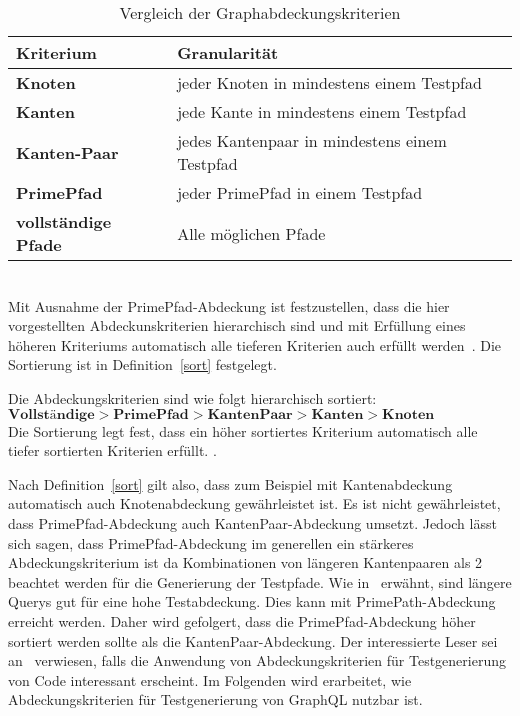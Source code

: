 \begin{center}
    \begin{table}[!ht]
        \begin{tabularx}{\textwidth}{|C|C|}
            \hline
            \textbf{Kriterium} & \textbf{Granularität}  \\
            \hline
            \textbf{Knoten} & jeder Knoten in mindestens einem Testpfad  \\
            \hline
            \textbf{Kanten} & jede Kante in mindestens einem Testpfad \\
            \hline
            \textbf{Kanten-Paar} & jedes Kantenpaar in mindestens einem Testpfad  \\
            \hline
            \textbf{PrimePfad} & jeder PrimePfad in einem Testpfad  \\
            \hline
            \textbf{vollständige Pfade} & Alle möglichen Pfade \\
            \hline
        \end{tabularx}
        \caption{Vergleich der Graphabdeckungskriterien}
    \end{table}
\end{center}
\\

Mit Ausnahme der PrimePfad-Abdeckung ist festzustellen, dass die hier vorgestellten Abdeckunskriterien hierarchisch sind und mit Erfüllung eines höheren Kriteriums automatisch alle tieferen Kriterien auch erfüllt werden~\cite[vgl. Figure 2.15]{software-testing}.
Die Sortierung ist in Definition~\ref{sort} festgelegt. \\

\begin{definition}
    Die Abdeckungskriterien sind wie folgt hierarchisch sortiert: \\
    $ \textbf{Vollständige} > \textbf{PrimePfad} > \textbf{KantenPaar} > \textbf{Kanten} > \textbf{Knoten} $ \\
    Die Sortierung legt fest, dass ein höher sortiertes Kriterium automatisch alle tiefer sortierten Kriterien erfüllt.
    \cite[vgl. Figure 2.15]{software-testing}.
    \label{sort}
\end{definition}

Nach Definition~\ref{sort} gilt also, dass zum Beispiel mit Kantenabdeckung automatisch auch Knotenabdeckung gewährleistet ist.
Es ist nicht gewährleistet, dass PrimePfad-Abdeckung auch KantenPaar-Abdeckung umsetzt.
Jedoch lässt sich sagen, dass PrimePfad-Abdeckung im generellen ein stärkeres Abdeckungskriterium ist da Kombinationen
von längeren Kantenpaaren als 2 beachtet werden für die Generierung der Testpfade.
Wie in~\cite[vgl. RQ 1]{property-based-testing} erwähnt, sind längere Querys gut für eine hohe Testabdeckung.
Dies kann mit PrimePath-Abdeckung erreicht werden.
Daher wird gefolgert, dass die PrimePfad-Abdeckung höher sortiert werden sollte als die KantenPaar-Abdeckung.
Der interessierte Leser sei an~\cite{software-testing} verwiesen, falls die Anwendung von Abdeckungskriterien für Testgenerierung von Code interessant erscheint.
Im Folgenden wird erarbeitet, wie Abdeckungskriterien für Testgenerierung von GraphQL nutzbar ist.